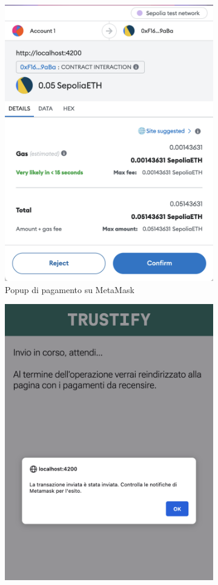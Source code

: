 \begin{figure}[H]
\begin{subfigure}[t]{0.32\textwidth}
    \includegraphics[width=0.9\linewidth]{src/img/checkout_metamask.png}
    \caption{Popup di pagamento su MetaMask}\label{fig:checkout_metamask}
    \end{subfigure}
    \centering
    \begin{subfigure}[t]{0.32\textwidth}
    \centering
    \includegraphics[width=0.9\linewidth]{src/img/checkout_conferma.png}

\end{subfigure}
\end{figure}
